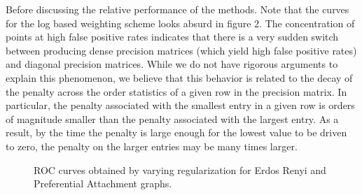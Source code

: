 \documentclass{uwstat572}
\theoremstyle{remark}
\theoremstyle{definition}
\begin{document}
Before discussing the relative performance of the methods.  Note that the curves for the log based weighting scheme looks absurd in figure 2.  The concentration of points at high false positive rates indicates that there is a very sudden switch between producing dense precision matrices (which yield high false positive rates) and diagonal precision matrices.  While we do not have rigorous arguments to explain this phenomenon, we believe that this behavior is related to the decay of the penalty across the order statistics of a given row in the precision matrix.  In particular, the penalty associated with the smallest entry in a given row is orders of magnitude smaller than the penalty associated with the largest entry.  As a result, by the time the penalty is large enough for the lowest value to be driven to zero, the penalty on the larger entries may be many times larger.

\begin{figure}
\centering
{}

\caption{ROC curves obtained by varying regularization for Erdos Renyi and Preferential Attachment graphs.}
\label{fig:parampart}
\end{figure}
\end{document}
